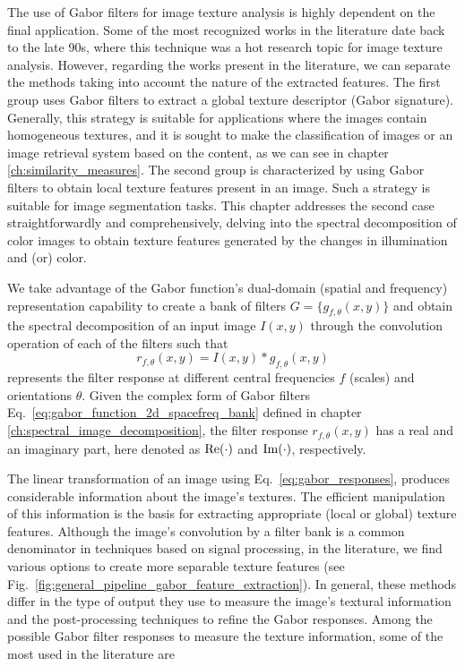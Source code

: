 The use of Gabor filters for image texture analysis is highly dependent on the final application. Some of the most recognized works in the literature date back to the late 90s, where this technique was a hot research topic for image texture analysis. However, regarding the works present in the literature, we can separate the methods taking into account the nature of the extracted features. The first group uses Gabor filters to extract a global texture descriptor (Gabor signature). Generally, this strategy is suitable for applications where the images contain homogeneous textures, and it is sought to make the classification of images or an image retrieval system based on the content, as we can see in chapter \ref{ch:similarity_measures}. The second group is characterized by using Gabor filters to obtain local texture features present in an image. Such a strategy is suitable for image segmentation tasks. This chapter addresses the second case straightforwardly and comprehensively, delving into the spectral decomposition of color images to obtain texture features generated by the changes in illumination and (or) color.

We take advantage of the Gabor function's dual-domain (spatial and frequency) representation capability to create a bank of filters $G=\{g_{f, \theta}(x, y) \}$ and obtain the spectral decomposition of an input image $I(x, y)$ through the convolution operation of each of the filters such that 
\begin{equation}\label{eq:gabor_responses}
    r_{f, \theta}(x,y) = I(x, y) \ast g_{f, \theta}(x,y)
\end{equation}
represents the filter response at different central frequencies $f$ (scales) and orientations $\theta$. Given the complex form of Gabor filters Eq.\ \eqref{eq:gabor_function_2d_spacefreq_bank} defined in chapter \ref{ch:spectral_image_decomposition}, the filter response $r_{f,\theta}(x, y)$ has a real and an imaginary part, here denoted as $\mathrm{Re}{(\cdot)}$ and $\mathrm{Im}{(\cdot)}$, respectively.

The linear transformation of an image using Eq.\ \eqref{eq:gabor_responses}, produces considerable information about the image's textures. The efficient manipulation of this information is the basis for extracting appropriate (local or global) texture features. Although the image's convolution by a filter bank is a common denominator in techniques based on signal processing, in the literature, we find various options to create more separable texture features (see Fig.\ \ref{fig:general_pipeline_gabor_feature_extraction}). In general, these methods differ in the type of output they use to measure the image's textural information and the post-processing techniques to refine the Gabor responses. Among the possible Gabor filter responses to measure the texture information, some of the most used in the literature are

